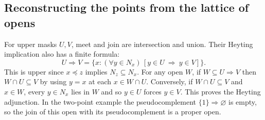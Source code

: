 \subsection{Reconstructing the points from the lattice of opens}

For upper masks $U,V$, meet and join are intersection and union. Their
Heyting implication also has a finite formula:
\[
 U\Rightarrow V=\{x:(\forall y\in N_x)\,[y\in U\ \Longrightarrow\ y\in V]\}.
\]
This is upper since $x\preceq z$ implies $N_z\subseteq N_x$. For any open
$W$, if $W\subseteq U\Rightarrow V$ then $W\cap U\subseteq V$ by using
$y=x$ at each $x\in W\cap U$. Conversely, if $W\cap U\subseteq V$ and
$x\in W$, every $y\in N_x$ lies in $W$ and so $y\in U$ forces $y\in V$.
This proves the Heyting adjunction. In the two-point example the
pseudocomplement $\{1\}\Rightarrow\varnothing$ is empty, so the join of
this open with its pseudocomplement is a proper open.


